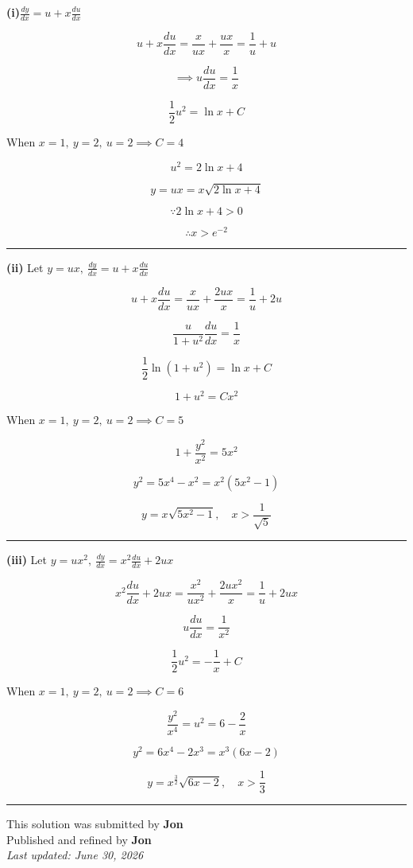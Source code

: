 \documentclass[12pt]{article}
\begin{document}
\newcommand{\ds}{\displaystyle}

\textbf{(i)}$\ds \frac{dy}{dx}=u+x\frac{du}{dx}$

$$u+x\frac{du}{dx}=\frac{x}{ux}+\frac{ux}{x}=\frac1u+u$$

$$\implies u\frac{du}{dx}=\frac1x$$

$$\frac12u^2=\ln x+C$$

When $\ds x=1,\ y=2,\ u=2\implies C=4$

$$u^2=2\ln x+4$$

$$y=ux=x\sqrt{2\ln x+4}$$

$$\because 2\ln x+4>0$$

$$\therefore x>e^{-2}$$

\bigskip\hrule\bigskip

\textbf{(ii)} Let $\ds y=ux,\ \frac{dy}{dx}=u+x\frac{du}{dx}$

$$u+x\frac{du}{dx}=\frac{x}{ux}+\frac{2ux}{x}=\frac1u+2u$$

$$\frac{u}{1+u^2}\frac{du}{dx}=\frac1x$$

$$\frac12\ln(1+u^2)=\ln x+C$$

$$1+u^2=Cx^2$$

When $\ds x=1,\ y=2,\ u=2\implies C=5$

$$1+\frac{y^2}{x^2}=5x^2$$

$$y^2=5x^4-x^2=x^2(5x^2-1)$$

$$y=x\sqrt{5x^2-1},\quad x>\frac1{\sqrt5}$$

\bigskip\hrule\bigskip

\textbf{(iii)} Let $\ds y=ux^2,\ \frac{dy}{dx}=x^2\frac{du}{dx}+2ux$

$$x^2\frac{du}{dx}+2ux=\frac{x^2}{ux^2}+\frac{2ux^2}{x}=\frac1u+2ux$$

$$u\frac{du}{dx}=\frac1{x^2}$$

$$\frac12u^2=-\frac1x+C$$

When $\ds x=1,\ y=2,\ u=2 \implies C=6$

$$\frac{y^2}{x^4}=u^2=6-\frac2x$$

$$y^2=6x^4-2x^3=x^3(6x-2)$$

$$y=x^{\frac32}\sqrt{6x-2},\quad x>\frac13$$

\bigskip
\hrule
\begin{center}
    This solution was submitted by \textbf{Jon}\\[4pt]
    Published and refined by \textbf{Jon}\\[8pt]
    \textit{Last updated: June 30, 2026}
\end{center}
\end{document}
